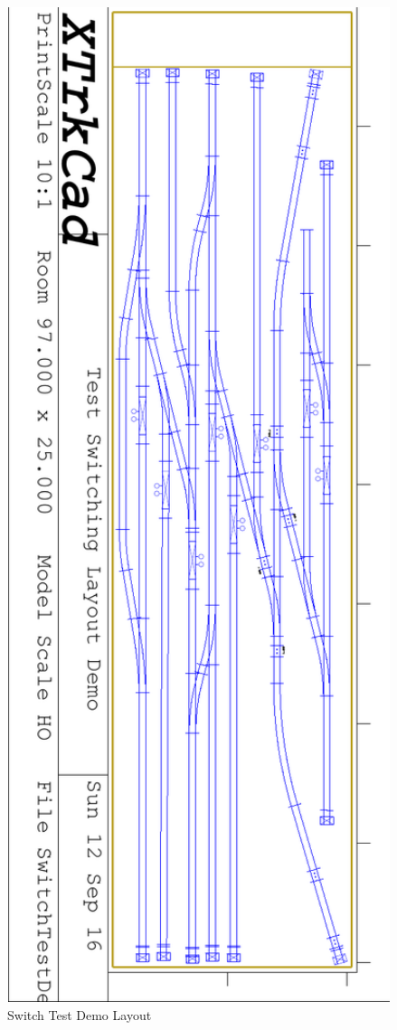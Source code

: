 \begin{figure}[hbpt]
\begin{centering}
\includegraphics[angle=90,width=5in]{SwitchTestDemo.pdf}
\caption{Switch Test Demo Layout}
\label{fig:TheLayout:SwitchTestDemo}
\end{centering}
\end{figure}
